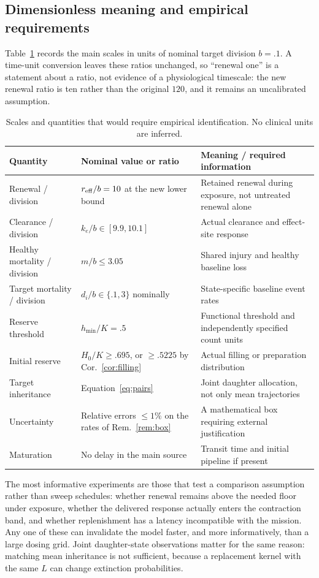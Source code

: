 \subsection{Dimensionless meaning and empirical requirements}
Table~\ref{tab:meaning} records the main scales in units of nominal target division $b=.1$. A time-unit conversion leaves these ratios unchanged, so ``renewal one'' is a statement about a ratio, not evidence of a physiological timescale: the new renewal ratio is ten rather than the original $120$, and it remains an uncalibrated assumption.
\begin{table}[tb]
\centering\small
\caption{Scales and quantities that would require empirical identification. No clinical units are inferred.}\label{tab:meaning}
\begin{tabularx}{\linewidth}{@{}l l >{\raggedright\arraybackslash}X@{}}
\toprule
Quantity & Nominal value or ratio & Meaning / required information\\
\midrule
Renewal / division & $r_{\mathrm{eff}}/b=10$ at the new lower bound & Retained renewal during exposure, not untreated renewal alone\\
Clearance / division & $k_e/b\in[9.9,10.1]$ & Actual clearance and effect-site response\\
Healthy mortality / division & $m/b\le3.05$ & Shared injury and healthy baseline loss\\
Target mortality / division & $d_i/b\in\{.1,3\}$ nominally & State-specific baseline event rates\\
Reserve threshold & $h_{\min}/K=.5$ & Functional threshold and independently specified count units\\
Initial reserve & $H_0/K\ge.695$, or $\ge.5225$ by Cor.~\ref{cor:filling} & Actual filling or preparation distribution\\
Target inheritance & Equation~\eqref{eq:pairs} & Joint daughter allocation, not only mean trajectories\\
Uncertainty & Relative errors $\le1\%$ on the rates of Rem.~\ref{rem:box} & A mathematical box requiring external justification\\
Maturation & No delay in the main source & Transit time and initial pipeline if present\\
\bottomrule
\end{tabularx}
\end{table}

The most informative experiments are those that test a comparison assumption rather than sweep schedules: whether renewal remains above the needed floor under exposure, whether the delivered response actually enters the contraction band, and whether replenishment has a latency incompatible with the mission. Any one of these can invalidate the model faster, and more informatively, than a large dosing grid. Joint daughter-state observations matter for the same reason: matching mean inheritance is not sufficient, because a replacement kernel with the same $L$ can change extinction probabilities.

